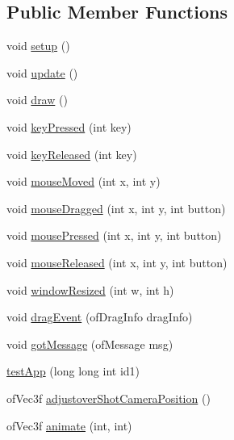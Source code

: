 \subsection*{Public Member Functions}
\begin{DoxyCompactItemize}
\item 
void \hyperlink{group___openframeworks_defaults_gad431db15b6150b965cd52bcba8e16e11}{setup} ()
\item 
void \hyperlink{group___openframeworks_defaults_gafb39d201aec71a295b7609876bf7d0c6}{update} ()
\item 
void \hyperlink{group___openframeworks_defaults_gaf869cba67b1dab8481f8d0e216d59dcd}{draw} ()
\item 
void \hyperlink{group___openframeworks_defaults_ga904d147c7e532cb92656d5dd4895cd26}{key\-Pressed} (int key)
\item 
void \hyperlink{group___openframeworks_defaults_ga1116a10088e4932f6d482efe723cd45e}{key\-Released} (int key)
\item 
void \hyperlink{group___openframeworks_defaults_ga33541b19eff9f8285b2487bfc146d58b}{mouse\-Moved} (int x, int y)
\item 
void \hyperlink{group___openframeworks_defaults_ga075bcc2be16fd8f3eaa9162fb40a0a1f}{mouse\-Dragged} (int x, int y, int button)
\item 
void \hyperlink{group___openframeworks_defaults_ga3f200702ce91859cac2872a39302679d}{mouse\-Pressed} (int x, int y, int button)
\item 
void \hyperlink{group___openframeworks_defaults_gaa3680ffc782b1e5c451289817f20c9c6}{mouse\-Released} (int x, int y, int button)
\item 
void \hyperlink{group___openframeworks_defaults_ga428b7df9c64352d6e7cb234fc297e6c9}{window\-Resized} (int w, int h)
\item 
void \hyperlink{group___openframeworks_defaults_gaf15e9e9064fe5ccbe6c82cc401ae9e09}{drag\-Event} (of\-Drag\-Info drag\-Info)
\item 
void \hyperlink{classtest_app_a66dbc8c5c2d4e20febebe9fd42b8c851}{got\-Message} (of\-Message msg)
\item 
\hyperlink{classtest_app_a43cbf11b718251f1fff8fbbe4a24d517}{test\-App} (long long int id1)
\item 
of\-Vec3f \hyperlink{group___camera_animation_ga2a792bfdf269fd69951cbf97d4f574af}{adjustover\-Shot\-Camera\-Position} ()
\item 
of\-Vec3f \hyperlink{group___camera_animation_ga1facfe2200dae7ad147b8f9ab31f68c6}{animate} (int, int)

\end{DoxyCompactItemize}

